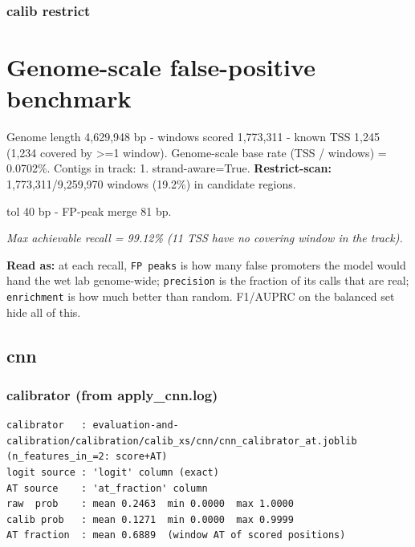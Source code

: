 \documentclass[10pt]{article}
\begin{document}
\subsubsection*{calib \textperiodcentered{} restrict}
\section*{Genome-scale false-positive benchmark}

Genome length 4,629,948 bp - windows scored 1,773,311 - known TSS 1,245 (1,234 covered by >=1 window). Genome-scale base rate (TSS / windows) = 0.0702\%. Contigs in track: 1. strand-aware=True. \textbf{Restrict-scan:} 1,773,311/9,259,970 windows (19.2\%) in candidate regions.

tol 40 bp - FP-peak merge 81 bp.

\begin{center}
\end{center}

{\itshape Max achievable recall = 99.12\% (11 TSS have no covering window in the track).}

\textbf{Read as:} at each recall, \texttt{FP peaks} is how many false promoters the model would hand the wet lab genome-wide; \texttt{precision} is the fraction of its calls that are real; \texttt{enrichment} is how much better than random. F1/AUPRC on the balanced set hide all of this.

\subsection*{cnn}

\subsubsection*{calibrator (from apply\_cnn.log)}
\begin{verbatim}
calibrator   : evaluation-and-calibration/calibration/calib_xs/cnn/cnn_calibrator_at.joblib  (n_features_in_=2: score+AT)
logit source : 'logit' column (exact)
AT source    : 'at_fraction' column
raw  prob    : mean 0.2463  min 0.0000  max 1.0000
calib prob   : mean 0.1271  min 0.0000  max 0.9999
AT fraction  : mean 0.6889  (window AT of scored positions)
\end{verbatim}
\end{document}
